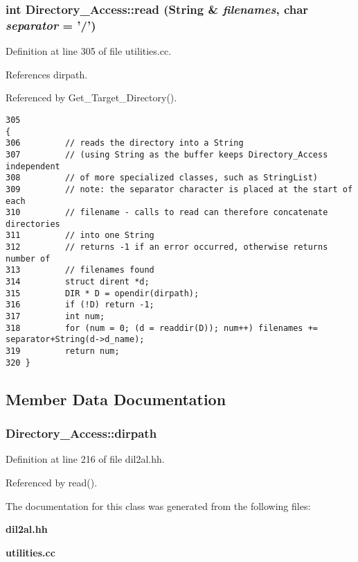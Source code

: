 \subsubsection{\setlength{\rightskip}{0pt plus 5cm}int Directory\_\-Access::read ({\bf String} \& {\em filenames}, char {\em separator} = '/')}\label{classDirectory__Access_a1}




Definition at line 305 of file utilities.cc.

References dirpath.

Referenced by Get\_\-Target\_\-Directory().



\footnotesize\begin{verbatim}305                                                                    {
306         // reads the directory into a String
307         // (using String as the buffer keeps Directory_Access independent
308         // of more specialized classes, such as StringList)
309         // note: the separator character is placed at the start of each
310         // filename - calls to read can therefore concatenate directories
311         // into one String
312         // returns -1 if an error occurred, otherwise returns number of
313         // filenames found
314         struct dirent *d;
315         DIR * D = opendir(dirpath);
316         if (!D) return -1;
317         int num;
318         for (num = 0; (d = readdir(D)); num++) filenames += separator+String(d->d_name);
319         return num;
320 }
\end{verbatim}\normalsize 


\subsection{Member Data Documentation}
\subsubsection{ Directory\_\-Access::dirpath\hspace{0.3cm}{\tt  [protected]}}\label{classDirectory__Access_n0}




Definition at line 216 of file dil2al.hh.

Referenced by read().

The documentation for this class was generated from the following files:\begin{CompactItemize}
\item 
{\bf dil2al.hh}\item 
{\bf utilities.cc}\end{CompactItemize}

